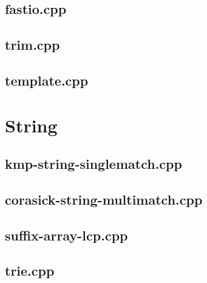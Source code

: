 \documentclass[10pt,twocolumn,landscape]{article}
\begin{document}
\subsection{fastio.cpp}


\subsection{trim.cpp}


\subsection{template.cpp}


\section{String}

\subsection{kmp-string-singlematch.cpp}


\subsection{corasick-string-multimatch.cpp}


\subsection{suffix-array-lcp.cpp}


\subsection{trie.cpp}

\end{document}
